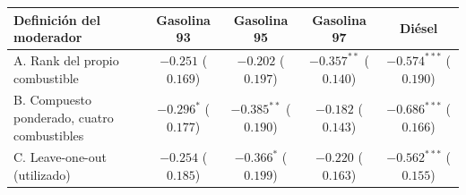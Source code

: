 \small
\begin{tabular}{lcccc}
\toprule
Definición del moderador & Gasolina 93 & Gasolina 95 & Gasolina 97 & Diésel \\
\midrule
A. Rank del propio combustible & $-0.251$ ($0.169$) & $-0.202$ ($0.197$) & $-0.357^{**}$ ($0.140$) & $-0.574^{***}$ ($0.190$) \\
B. Compuesto ponderado, cuatro combustibles & $-0.296^{*}$ ($0.177$) & $-0.385^{**}$ ($0.190$) & $-0.182$ ($0.143$) & $-0.686^{***}$ ($0.166$) \\
C. Leave-one-out (utilizado) & $-0.254$ ($0.185$) & $-0.366^{*}$ ($0.199$) & $-0.220$ ($0.163$) & $-0.562^{***}$ ($0.155$) \\
\bottomrule
\end{tabular}
